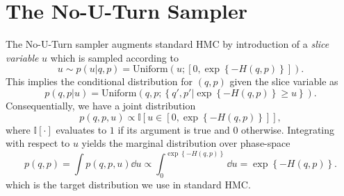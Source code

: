 \section{The No-U-Turn Sampler}
The No-U-Turn sampler augments standard HMC by introduction of a \textit{slice variable} $u$ which is sampled according to
\begin{equation}
    u \sim p(u|q, p) = \text{Uniform}\left(u; \left[0, \exp\left\{-H(q, p)\right\}\right]\right).
\end{equation} 
This implies the conditional distribution for $(q, p)$ given the slice variable as
\begin{equation}
    p(q, p|u) = \text{Uniform}\left( q, p; \left\{q', p' \bigg| \exp\left\{-H(q, p)\right\} \geq u \right\} \right).
\end{equation}
Consequentially, we have a joint distribution 
\begin{equation}
    p(q, p, u) \propto \mathbb{I}\left[u \in \left[0, \exp\left\{-H(q, p)\right\}\right]\right],
\end{equation}
where $\mathbb{I}[\cdot]$ evaluates to $1$ if its argument is true and $0$ otherwise. 
Integrating with respect to $u$ yields the marginal distribution
over phase-space
\begin{equation}
    p(q, p) = \int p(q, p, u) \dd u \propto \int_0^{\exp\left\{-H(q, p)\right\}}\dd u = \exp\left\{-H(q, p)\right\}.
\end{equation}
which is the target distribution we use in standard HMC.

